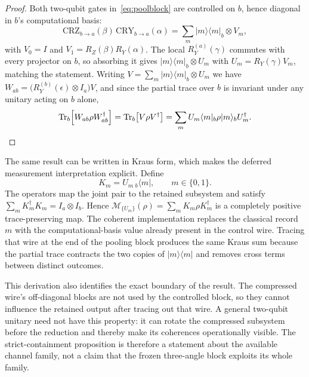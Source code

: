 \documentclass[conference]{IEEEtran}
\begin{document}
\begin{proof}
Both two-qubit gates in~\eqref{eq:poolblock} are controlled on $b$, hence diagonal in $b$'s computational basis:
\begin{equation}
\text{CRZ}_{b \to a}(\beta)\,\text{CRY}_{b \to a}(\alpha) = \sum_{m} |m\rangle\langle m|_b \otimes V_m,
\end{equation}
with $V_0 = I$ and $V_1 = R_Z(\beta) R_Y(\alpha)$. The local $R_Y^{(a)}(\gamma)$ commutes with every projector on $b$, so absorbing it gives $|m\rangle\langle m|_b \otimes U_m$ with $U_m = R_Y(\gamma) V_m$, matching the statement. Writing $V = \sum_m |m\rangle\langle m|_b \otimes U_m$ we have $W_{ab} = \big(R_Y^{(b)}(\epsilon) \otimes I_a\big) V$, and since the partial trace over $b$ is invariant under any unitary acting on $b$ alone,
\begin{equation}
\mathrm{Tr}_b\!\left[W_{ab} \rho W_{ab}^{\dagger}\right] = \mathrm{Tr}_b\!\left[V \rho V^{\dagger}\right] = \sum_m U_m \langle m|_b \rho |m\rangle_b U_m^{\dagger}. \qedhere
\end{equation}
\end{proof}

The same result can be written in Kraus form, which makes the deferred
measurement interpretation explicit. Define
\begin{equation}
K_m=U_m\,{}_b\!\langle m|,\qquad m\in\{0,1\}.
\label{eq:pool-kraus}
\end{equation}
The operators map the joint pair to the retained subsystem and satisfy
$\sum_m K_m^{\dagger}K_m=I_a\otimes I_b$. Hence
$\mathcal{M}_{\{U_m\}}(\rho)=\sum_mK_m\rho K_m^{\dagger}$ is a completely
positive trace-preserving map. The coherent implementation replaces the
classical record $m$ with the computational-basis value already present in
the control wire. Tracing that wire at the end of the pooling block produces
the same Kraus sum because the partial trace contracts the two copies of
$|m\rangle\langle m|$ and removes cross terms between distinct outcomes.

This derivation also identifies the exact boundary of the result. The
compressed wire's off-diagonal blocks are not used by the controlled block,
so they cannot influence the retained output after tracing out that wire. A
general two-qubit unitary need not have this property: it can rotate the
compressed subsystem before the reduction and thereby make its coherences
operationally visible. The strict-containment proposition is therefore a
statement about the available channel family, not a claim that the frozen
three-angle block exploits its whole family.
\end{document}
